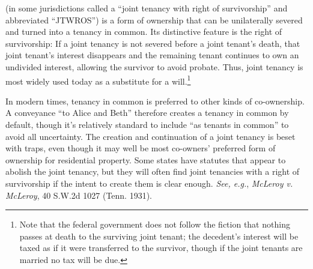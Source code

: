 (in some jurisdictions called a ``joint
tenancy with right of
survivorship'' and abbreviated ``JTWROS'') is a form of ownership that can be
unilaterally severed and turned into a tenancy in common. Its distinctive
feature is the right of survivorship: If a joint tenancy is not severed before
a joint tenant's death, that joint tenant's interest disappears and the
remaining tenant continues to own an undivided interest, allowing the survivor
to avoid probate. Thus, joint tenancy is most widely used today as a
substitute for a will.\footnote{Note that the federal government does not
follow the fiction that nothing passes at death to the surviving joint tenant;
the decedent's interest will be taxed as if it were transferred to the
survivor, though if the joint tenants are married no tax will be due.}

In modern times, tenancy in common is preferred to other kinds of co-ownership.
A conveyance ``to Alice and Beth'' therefore creates a tenancy in common by
default, though it's relatively standard to include ``as tenants in common'' to
avoid all uncertainty. The creation and continuation of a joint tenancy is
beset with traps, even though it may well be most co-owners' preferred form of
ownership for residential property. Some states have statutes that appear to
abolish the joint tenancy, but they will often find joint tenancies with a right
of survivorship if the intent to create them is clear enough. \emph{See, e.g.},
\emph{McLeroy v. McLeroy}, 40 S.W.2d 1027 (Tenn. 1931).

